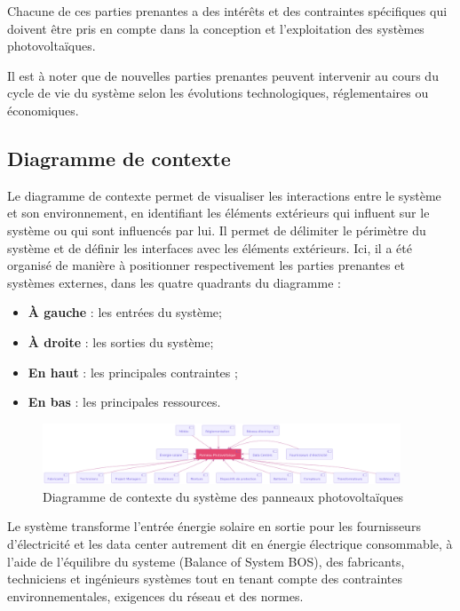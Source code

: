 \documentclass{article}
\begin{document}
Chacune de ces parties prenantes a des intérêts et des contraintes spécifiques qui doivent être pris en compte dans la conception et l'exploitation des systèmes photovoltaïques.

Il est à noter que de nouvelles parties prenantes peuvent intervenir au cours du cycle de vie du système selon les évolutions technologiques, réglementaires ou économiques. 
\subsection{Diagramme de contexte} 

Le diagramme de contexte permet de visualiser les interactions entre le système et son environnement, en identifiant les éléments extérieurs qui influent sur le système ou qui sont influencés par lui. Il permet de délimiter le périmètre du système et de définir les interfaces avec les éléments extérieurs. Ici, il a été organisé de manière à positionner respectivement les parties prenantes et systèmes externes, dans les quatre quadrants du diagramme :
\begin{itemize}
    \item \textbf{À gauche} : les entrées du système;
    \item \textbf{À droite} : les sorties du système;
    \item \textbf{En haut} : les principales contraintes ;
    \item \textbf{En bas} : les principales ressources.
\end{itemize} 

\vspace{50pt}
\begin{figure}[H]
    \centering
    \includegraphics[width=0.95\textwidth]{diagramme_de_contexte.png}
    \caption{Diagramme de contexte du système des panneaux photovoltaïques}
    \label{fig:diagramme_contexte}
\end{figure}
\vspace{10pt}

Le système transforme l'entrée énergie solaire en sortie pour les fournisseurs d'électricité et les data center autrement dit en énergie électrique consommable, à l'aide de l'équilibre du systeme (Balance of System BOS), des fabricants, techniciens et ingénieurs systèmes tout en tenant compte des contraintes environnementales, exigences du réseau et des normes.  
\end{document}

